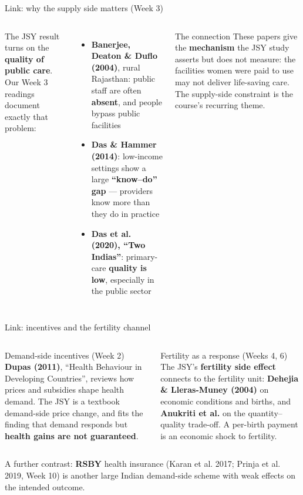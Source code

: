 \documentclass[aspectratio=169,11pt]{beamer}
\begin{document}
\begin{frame}{Link: why the supply side matters (Week 3)}
  \begin{columns}[T]
    The JSY result turns on the \textbf{quality of public care}. Our Week 3 readings document exactly that problem:
    \vspace{0.3em}
    \begin{itemize}
      \item \textbf{Banerjee, Deaton \& Duflo (2004)}, rural Rajasthan: public staff are often \textbf{absent}, and people bypass public facilities
      \item \textbf{Das \& Hammer (2014)}: low-income settings show a large \textbf{``know--do'' gap} --- providers know more than they do in practice
      \item \textbf{Das et al. (2020), ``Two Indias''}: primary-care \textbf{quality is low}, especially in the public sector
    \end{itemize}
    \begin{block}{The connection}
      {\footnotesize These papers give the \textbf{mechanism} the JSY study asserts but does not measure: the facilities women were paid to use may not deliver life-saving care. The supply-side constraint is the course's recurring theme.}
    \end{block}
  \end{columns}
\end{frame}

\begin{frame}{Link: incentives and the fertility channel}
  \begin{columns}[T]
    \begin{block}{Demand-side incentives (Week 2)}
      {\footnotesize \textbf{Dupas (2011)}, ``Health Behaviour in Developing Countries'', reviews how prices and subsidies shape health demand. The JSY is a textbook demand-side price change, and fits the finding that demand responds but \textbf{health gains are not guaranteed}.}
    \end{block}
    \begin{block}{Fertility as a response (Weeks 4, 6)}
      {\footnotesize The JSY's \textbf{fertility side effect} connects to the fertility unit: \textbf{Dehejia \& Lleras-Muney (2004)} on economic conditions and births, and \textbf{Anukriti et al.} on the quantity--quality trade-off. A per-birth payment is an economic shock to fertility.}
    \end{block}
  \end{columns}
  \vspace{0.3em}
  \footnotesize A further contrast: \textbf{RSBY} health insurance (Karan et al. 2017; Prinja et al. 2019, Week 10) is another large Indian demand-side scheme with weak effects on the intended outcome.
\end{frame}
\end{document}
